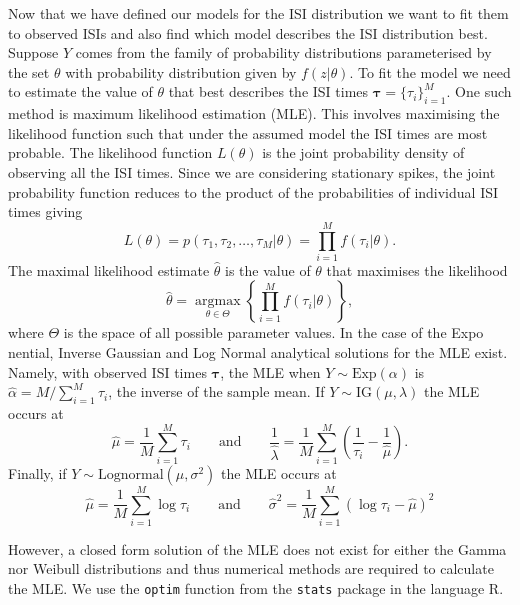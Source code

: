 \documentclass[oneside, 12 pt]{book}
\DeclareMathOperator*{\argmax}{argmax}
\begin{document}
Now that we have defined our models for the ISI distribution we want to fit them to observed ISIs and also find which model describes the ISI distribution best. Suppose $Y$ comes from the family of probability distributions parameterised by the set $\theta$ with probability distribution given by $f(z|\theta)$. To fit the model we need to estimate the value of $\theta$ that best describes the ISI times $\boldsymbol \tau = \{\tau_i\}^{M}_{i=1}$. One such method is maximum likelihood estimation (MLE). This involves maximising the likelihood function such that under the assumed model the ISI times are most probable. The likelihood function $L(\theta)$ is the joint probability density of observing all the ISI times.  Since we are considering stationary  spikes, the joint probability function reduces to the product of the probabilities of individual ISI times giving
$$
L(\theta) = p(\tau_1,\tau_2, \dots, \tau_{M}| \theta) = \prod^{M}_{i=1} f(\tau_i|\theta).
$$
The maximal likelihood estimate $\hat \theta$ is the value of $\theta$ that maximises the likelihood
$$
\hat \theta  =  \argmax\limits_{\theta \in \Theta}  \left\{ \prod ^M_{i=1} f(\tau_i | \theta ) \right\},
$$
where $\Theta$ is the space of all possible parameter values. In the case of the Expo nential, Inverse Gaussian and Log Normal analytical solutions for the MLE exist. Namely, with observed ISI times $\boldsymbol \tau$, the MLE when $Y \sim \text{Exp}(\alpha)$ is $\hat \alpha = M/\sum^{M}_{i=1}\tau_i$, the inverse of the sample mean. If $Y \sim \text{IG}(\mu,\lambda)$ the MLE occurs at
 $$
 \hat \mu = \frac{1}{M}\sum^{M}_{i=1} \tau_i \qquad \text{and} \qquad  
 \frac{1}{\hat \lambda} = \frac{1}{M}\sum^{M}_{i=1}\left(\frac{1}{\tau_i} - \frac{1}{\hat \mu}\right).
 $$
  Finally, if $Y \sim \text{Lognormal}(\mu, \sigma^2)$ the MLE occurs at 
  $$\hat \mu = \frac{1}{M}\sum^{M}_{i=1}\log \tau_i  \qquad \text{and} \qquad \hat \sigma^2 = \frac{1}{M}\sum^{M}_{i=1}\left( \log \tau_i -\hat \mu \right)^2 $$

 However, a closed form solution of the MLE does not exist for either the Gamma nor Weibull distributions and thus numerical methods are required to calculate the MLE. We use the \texttt{optim} function from the \texttt{stats} package in the language R.  

\end{document}
